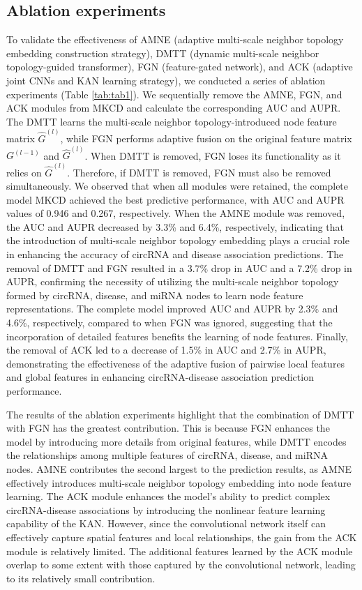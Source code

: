 \documentclass[journal,twoside,web]{ieeecolor}
\begin{document}
\subsection{Ablation experiments}
To validate the effectiveness of AMNE (adaptive multi-scale neighbor topology embedding construction strategy), DMTT (dynamic multi-scale neighbor topology-guided transformer), FGN (feature-gated network), and ACK (adaptive joint CNNs and KAN learning strategy), we conducted a series of ablation experiments (Table \ref{tab:tab1}). 
We sequentially remove the AMNE, FGN, and ACK modules from MKCD and calculate the corresponding AUC and AUPR. The DMTT learns the multi-scale neighbor topology-introduced node feature matrix $\hat{G}^{(l)}$, while FGN performs adaptive fusion on the original feature matrix $G^{(l-1)}$ and $\hat{G}^{(l)}$. When DMTT is removed, FGN loses its functionality as it relies on $\hat{G}^{(l)}$. Therefore, if DMTT is removed, FGN must also be removed simultaneously. %
We observed that when all modules were retained, the complete model MKCD achieved the best predictive performance, with AUC and AUPR values of 0.946 and 0.267, respectively. When the AMNE module was removed, the AUC and AUPR decreased by 3.3\% and 6.4\%, respectively, indicating that the introduction of multi-scale neighbor topology embedding plays a crucial role in enhancing the accuracy of circRNA and disease association predictions. The removal of DMTT and FGN resulted in a 3.7\% drop in AUC and a 7.2\% drop in AUPR, confirming the necessity of utilizing the multi-scale neighbor topology formed by circRNA, disease, and miRNA nodes to learn node feature representations. The complete model improved AUC and AUPR by 2.3\% and 4.6\%, respectively, compared to when FGN was ignored, suggesting that the incorporation of detailed features benefits the learning of node features. Finally, the removal of ACK led to a decrease of 1.5\% in AUC and 2.7\% in AUPR, demonstrating the effectiveness of the adaptive fusion of pairwise local features and global features in enhancing circRNA-disease association prediction performance.


The results of the ablation experiments highlight that the combination of DMTT with FGN has the greatest contribution. This is because FGN enhances the model by introducing more details from original features, while DMTT encodes the relationships among multiple features of circRNA, disease, and miRNA nodes. %
AMNE contributes the second largest to the prediction results, as AMNE effectively introduces multi-scale neighbor topology embedding into node feature learning. The ACK module enhances the model's ability to predict complex circRNA-disease associations by introducing the nonlinear feature learning capability of the KAN. However, since the convolutional network itself can effectively capture spatial features and local relationships, the gain from the ACK module is relatively limited. The additional features learned by the ACK module overlap to some extent with those captured by the convolutional network, leading to its relatively small contribution.%
\end{document}
